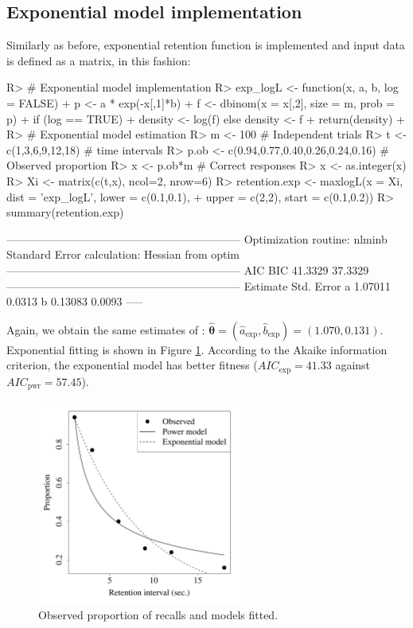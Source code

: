 \documentclass[nojss]{jss}
\begin{document}
\subsection*{Exponential model implementation}

Similarly as before, exponential retention function is implemented and input data is defined as a matrix, in this fashion:

\begin{Schunk}
\begin{Sinput}
R> # Exponential model implementation
R> exp_logL <- function(x, a, b, log = FALSE){
+    p <- a * exp(-x[,1]*b)
+    f <- dbinom(x = x[,2], size = m, prob = p)
+    if (log == TRUE)
+      density <- log(f) else density <- f
+    return(density)
+  }
R> # Exponential model estimation
R> m <- 100 # Independent trials
R> t <- c(1,3,6,9,12,18) # time intervals
R> p.ob <- c(0.94,0.77,0.40,0.26,0.24,0.16) # Observed proportion
R> x <- p.ob*m # Correct responses
R> x <- as.integer(x)
R> Xi <- matrix(c(t,x), ncol=2, nrow=6)
R> retention.exp <- maxlogL(x = Xi, dist = 'exp_logL', lower = c(0.1,0.1),
+                           upper = c(2,2), start = c(0.1,0.2))
R> summary(retention.exp)
\end{Sinput}
\begin{Soutput}
---------------------------------------------------------------
Optimization routine: nlminb 
Standard Error calculation: Hessian from optim 
---------------------------------------------------------------
      AIC     BIC
  41.3329 37.3329
---------------------------------------------------------------
  Estimate  Std. Error
a   1.07011     0.0313
b   0.13083     0.0093
-----
\end{Soutput}
\end{Schunk}

Again, we obtain the same estimates of \cite{Myung2003}: $\hat{\boldsymbol{\theta}}=(\hat{a}_{\text{exp}},\hat{b}_{\text{exp}})=(1.070,0.131)$. Exponential fitting is shown in Figure \ref{fig:forgetting}. According to the Akaike information criterion, the exponential model has better fitness ($AIC_{\text{exp}}=41.33$ against $AIC_{\text{pwr}}=57.45$).


\begin{figure}[H]
\centering
  \includegraphics[width=0.6\textwidth]{article-RetentionPlot}
  \caption{\label{fig:forgetting} Observed proportion of recalls and models fitted.}
\end{figure}
\end{document}
